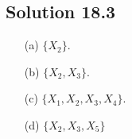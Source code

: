 \subsection*{Solution 18.3}

\begin{itemize}
    \item[(a)] $\{X_2\}$.
    \item[(b)] $\{X_2, X_3\}$.
    \item[(c)] $\{X_1, X_2, X_3, X_4\}$.
    \item[(d)] $\{X_2, X_3, X_5\}$
\end{itemize}

